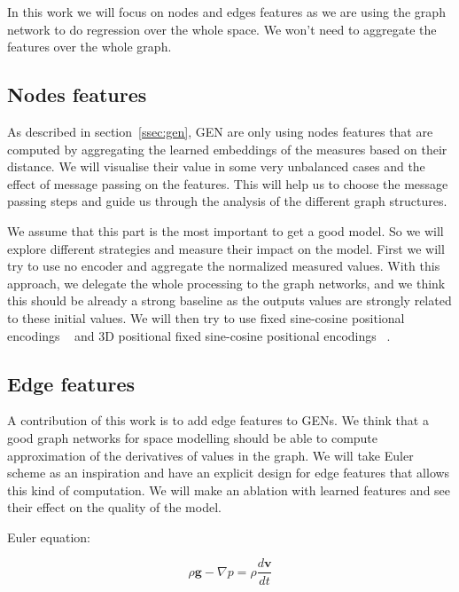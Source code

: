 \documentclass[a4paper,10pt]{article}
\newcommand{\ap}[1]{\marginpar{{\tiny \color{red} [AP] #1}}}
\begin{document}
In this work we will focus on nodes and edges features as we are using the graph network to do regression over the whole space. We won't need to aggregate the features over the whole graph.


\subsection{Nodes features}
As described in section~\ref{ssec:gen}, GEN are only using nodes features that are computed by aggregating the learned embeddings of the measures based on their distance. We will visualise their value in some very unbalanced cases and the effect of message passing on the features. This will help us to choose the message passing steps and guide us through the analysis of the different graph structures.

We assume that this part is the most important to get a good model. So we will explore different strategies and measure their impact on the model. First we will try to use no encoder and aggregate the normalized measured values. With this approach, we delegate the whole processing to the graph networks, and we think this should be already a strong baseline as the outputs values are strongly related to these initial values. We will then try to use fixed sine-cosine positional encodings ~\cite{vaswani2017attention} and 3D positional fixed sine-cosine positional encodings ~\cite{chu2021conditional}.

\subsection{Edge features}
A contribution of this work is to add edge features to GENs. We think that a good graph networks for space modelling should be able to compute approximation of the derivatives of values in the graph. We will take Euler scheme as an inspiration and have an explicit design for edge features that allows this kind of computation. We will make an ablation with learned features and see their effect on the quality of the model.
\ap{TODO: sketch}


Euler equation:

\begin{equation}
  \rho \mathbf{g} - \nabla p = \rho\frac{d\mathbf{v}}{dt}
\end{equation}


\end{document}
